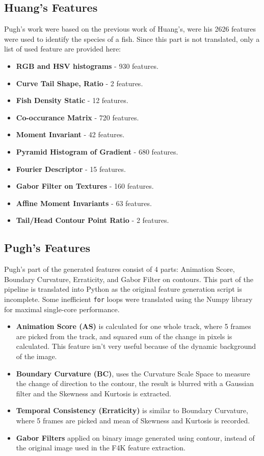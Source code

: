 \documentclass[bsc,logo,twoside,fullspacing,parskip]{infthesis}
\begin{document}
\subsection{Huang's Features}

Pugh's work were based on the previous work of Huang's\cite{Huang}, were his 2626 features were used to identify the species of a fish.
Since this part is not translated, only a list of used feature are provided here:
\begin{itemize}
\setlength{\parskip}{1pt}
\item \textbf{RGB and HSV histograms} - 930 features.
\item \textbf{Curve Tail Shape, Ratio} - 2 features.
\item \textbf{Fish Density Static} - 12 features.
\item \textbf{Co-occurance Matrix} - 720 features.
\item \textbf{Moment Invariant} - 42 features.
\item \textbf{Pyramid Histogram of Gradient} - 680 features.
\item \textbf{Fourier Descriptor} - 15 features.
\item \textbf{Gabor Filter on Textures} - 160 features.
\item \textbf{Affine Moment Invariants} - 63 features.
\item \textbf{Tail/Head Contour Point Ratio} - 2 features.
\end{itemize}

\subsection{Pugh's Features}

Pugh's part of the generated features consist of 4 parts: Animation Score, Boundary Curvature, Erraticity, and Gabor Filter on contours. 
This part of the pipeline is translated into Python as the original feature generation script is incomplete. Some inefficient {\tt for} loops were translated using the Numpy library for maximal single-core performance.

\begin{itemize}
\setlength{\parskip}{1pt}
\item
\textbf{Animation Score (AS)} is calculated for one whole track, where 5 frames are picked from the track, and squared sum of the change in pixels is calculated. This feature isn't very useful because of the dynamic background of the image.
\item
\textbf{Boundary Curvature (BC)}, uses the Curvature Scale Space to measure the change of direction to the contour, the result is blurred with a Gaussian filter and the Skewness and Kurtosis is extracted. 
\item
\textbf{Temporal Consistency (Erraticity)} is similar to Boundary Curvature, where 5 frames are picked and mean of Skewness and Kurtosis is recorded.
\item
\textbf{Gabor Filters} applied on binary image generated using contour, instead of the original image used in the F4K feature extraction. 
\end{itemize}
\end{document}

